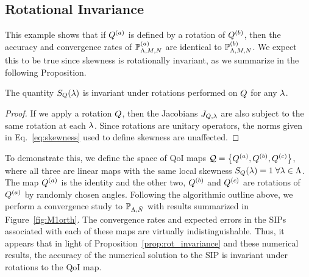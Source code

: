 \subsection{Rotational Invariance}\label{ex:rotation}
This example shows that if $Q^{(a)}$ is defined by a rotation of $Q^{(b)}$, then the accuracy and convergence rates of $\mathbb{P}^{(a)}_{{\Lambda}, M, N}$ are identical to $\mathbb{P}^{(b)}_{{\Lambda}, M, N}$.
We expect this to be true since skewness is rotationally invariant, as we summarize in the following Proposition.
\begin{prop}
The quantity $S_Q(\lambda)$ is invariant under rotations performed on $Q$ for any $\lambda$. \\
\label{prop:rot_invariance}
\end{prop}
\begin{proof}
If we apply a rotation $Q$, then the Jacobians $J_{Q, \lambda}$ are also subject to the same rotation at each $\lambda$.
Since rotations are unitary operators, the norms given in Eq.~\eqref{eq:skewness} used to define skewness are unaffected.
\end{proof}

To demonstrate this, we define the space of QoI maps $\mathcal{Q} = \left\{ Q^{(a)} , Q^{(b)}, Q^{(c)} \right\}$, where all three are linear maps with the same local skewness $S_Q (\lambda) = 1 \; \forall \lambda \in {\Lambda}$.
The map $Q^{(a)}$ is the identity and the other two, $Q^{(b)}$ and $Q^{(c)}$ are rotations of $Q^{(a)}$ by randomly chosen angles.
Following the algorithmic outline above, we perform a convergence study to $\mathbb{P}_{{\Lambda},\bar{N}}$ with results summarized in Figure~\ref{fig:M1orth}.
The convergence rates and expected errors in the SIPs associated with each of these maps are virtually indistinguishable.
Thus, it appears that in light of Proposition~\ref{prop:rot_invariance} and these numerical results, the accuracy of the numerical solution to the SIP is invariant under rotations to the QoI map.

